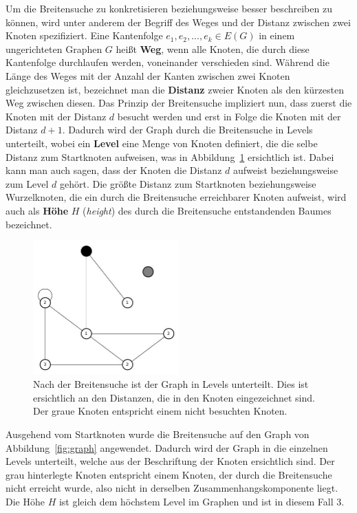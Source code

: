 \documentclass[11pt,a4paper]{article}
\begin{document}
Um die Breitensuche zu konkretisieren beziehungsweise besser beschreiben zu können, wird unter anderem der Begriff des Weges und der Distanz zwischen zwei Knoten spezifiziert. Eine Kantenfolge \(e_{1}, e_{2}, ..., e_{k} \in E(G)\) in einem ungerichteten Graphen \(G\) heißt \textbf{Weg}, wenn alle Knoten, die durch diese Kantenfolge durchlaufen werden, voneinander verschieden sind. Während die Länge des Weges mit der Anzahl der Kanten zwischen zwei Knoten gleichzusetzen ist, bezeichnet man die \textbf{Distanz} zweier Knoten  als den kürzesten Weg zwischen diesen. Das Prinzip der Breitensuche impliziert nun, dass zuerst die Knoten mit der Distanz \(d\) besucht werden und erst in Folge die Knoten mit der Distanz \(d+1\). Dadurch wird der Graph durch die Breitensuche in Levels unterteilt, wobei ein \textbf{Level} eine Menge von Knoten definiert, die die selbe Distanz zum Startknoten aufweisen, was in Abbildung~\ref{fig:graph_level} ersichtlich ist. Dabei kann man auch sagen, dass der Knoten die Distanz \(d\) aufweist beziehungsweise zum Level \(d\) gehört. Die größte Distanz zum Startknoten beziehungsweise Wurzelknoten, die ein durch die Breitensuche erreichbarer Knoten aufweist, wird auch als \textbf{Höhe} \(H\) (\textit{height}) des durch die Breitensuche entstandenden Baumes bezeichnet.\\
\begin{figure}[h]
 	\centering
	\includegraphics[width=0.5\textwidth]{graph_level}
 	\caption{Nach der Breitensuche ist der Graph in Levels unterteilt. Dies ist ersichtlich an den Distanzen, die in den Knoten eingezeichnet sind. Der graue Knoten entspricht einem nicht besuchten Knoten.}
	\label{fig:graph_level}
\end{figure}
Ausgehend vom Startknoten wurde die Breitensuche auf den Graph von Abbildung~\ref{fig:graph} angewendet. Dadurch wird der Graph in die einzelnen Levels unterteilt, welche aus der Beschriftung der Knoten ersichtlich sind. Der grau hinterlegte Knoten entspricht einem Knoten, der durch die Breitensuche nicht erreicht wurde, also nicht in derselben Zusammenhangskomponente liegt. Die Höhe \(H\) ist gleich dem höchstem Level im Graphen und ist in diesem Fall \(3\).
\end{document}
